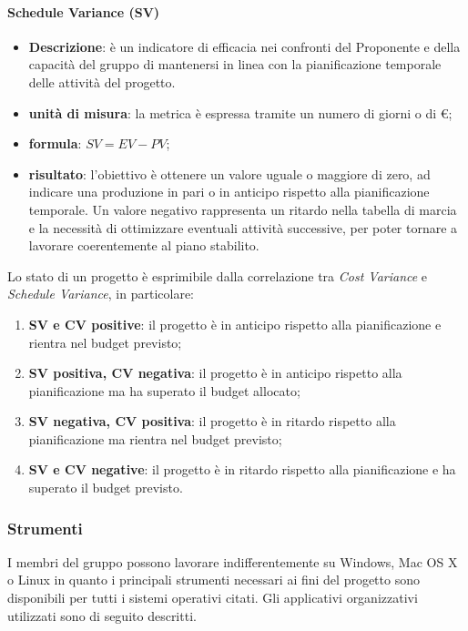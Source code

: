				\paragraph{Schedule Variance (SV)}
					\begin{itemize}
						\item \textbf{Descrizione}: è un indicatore di efficacia nei confronti del Proponente e della capacità del gruppo di mantenersi in linea con la pianificazione temporale delle attività del progetto.
						\item \textbf{unità di misura}: la metrica è espressa tramite un numero di giorni o di \euro;
						\item \textbf{formula}: $SV = EV - PV$;
						\item \textbf{risultato}: l'obiettivo è ottenere un valore uguale o maggiore di zero, ad indicare una produzione in pari o in anticipo rispetto alla pianificazione temporale. Un valore negativo rappresenta un ritardo nella tabella di marcia e la necessità di ottimizzare eventuali attività successive, per poter tornare a lavorare coerentemente al piano stabilito.
					\end{itemize}
		        Lo stato di un progetto è esprimibile dalla correlazione tra \textit{Cost Variance} e \textit{Schedule Variance}, in particolare:
		        \begin{enumerate}
			          \item{\textbf{SV e CV positive}: il progetto è in anticipo rispetto alla pianificazione e rientra nel budget previsto;}
			          \item{\textbf{SV positiva, CV negativa}: il progetto è in anticipo rispetto alla pianificazione ma ha superato il budget allocato;}
			          \item{\textbf{SV negativa, CV positiva}: il progetto è in ritardo rispetto alla pianificazione ma rientra nel budget previsto;}
			          \item{\textbf{SV e CV negative}: il progetto è in ritardo rispetto alla pianificazione e ha superato il budget previsto.}
		        \end{enumerate}
			\subsubsection{Strumenti}
				I membri del gruppo \Gruppo{} possono lavorare indifferentemente su Windows, Mac OS X o Linux in quanto i principali strumenti necessari ai fini del progetto sono disponibili per tutti i sistemi operativi citati. Gli applicativi organizzativi utilizzati sono di seguito descritti.
				
